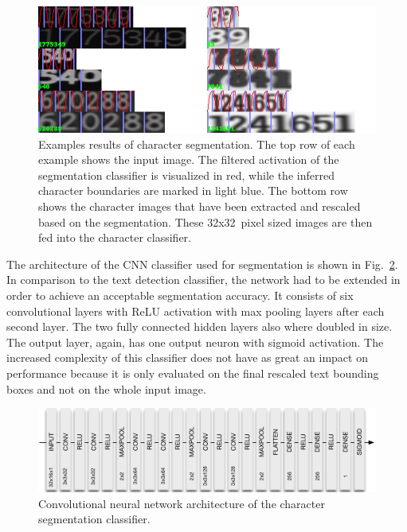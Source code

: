 \documentclass[11pt]{article}
\newcommand\figref[1]{Fig.~\ref{fig:#1}}
\begin{document}
\begin{figure}[ht]
    \centering
    \includegraphics[width=1.1\linewidth]{fig/segmentation}
    \caption{
      Examples results of character segmentation. The top row of each example shows the input
      image. The filtered activation of the segmentation classifier is visualized in red,
      while the inferred character boundaries are marked in light blue.
      The bottom row shows the character images that have been extracted and rescaled based on the
      segmentation. These 32x32~pixel sized images are then fed into the character classifier. }
    \label{fig:segmentation}
\end{figure}

The architecture of the CNN classifier used for segmentation is shown in \figref{segmentation_cnn}.
In comparison to the text detection classifier, the network had to be extended in order
to achieve an acceptable segmentation accuracy. It consists of six convolutional layers
with ReLU activation with max pooling layers after each second layer. The two fully connected
hidden layers also where doubled in size. The output layer, again, has one output neuron
with sigmoid activation. The increased complexity of this classifier does not have as
great an impact on performance because it is only evaluated on the final rescaled text bounding boxes
and not on the whole input image.

\begin{figure}[ht]
  \centering
  \includegraphics[scale=0.75]{fig/Segmentation_CNN}
  \caption
  {
    Convolutional neural network architecture of the character segmentation classifier.
  }
  \label{fig:segmentation_cnn}
\end{figure}
\end{document}
